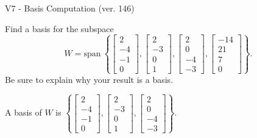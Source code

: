 \begin{exercise}
  \begin{exerciseTitle}V7 - Basis Computation (ver. 146)\end{exerciseTitle}
  \begin{exerciseStatement}
    Find a basis for the subspace 
\[W=\mathrm{span}\ \left\{\left[\begin{array}{r}
2 \\
-4 \\
-1 \\
0
\end{array}\right] , \left[\begin{array}{r}
2 \\
-3 \\
0 \\
1
\end{array}\right] , \left[\begin{array}{r}
2 \\
0 \\
-4 \\
-3
\end{array}\right] , \left[\begin{array}{r}
-14 \\
21 \\
7 \\
0
\end{array}\right]\right\}.\]
 Be sure to explain why your result is a basis.


  \end{exerciseStatement}
  \begin{exerciseAnswer}
   A basis of \(W\) is  \(\left\{\left[\begin{array}{r}
2 \\
-4 \\
-1 \\
0
\end{array}\right] , \left[\begin{array}{r}
2 \\
-3 \\
0 \\
1
\end{array}\right] , \left[\begin{array}{r}
2 \\
0 \\
-4 \\
-3
\end{array}\right]\right\}\).
  


  \end{exerciseAnswer}
\end{exercise}